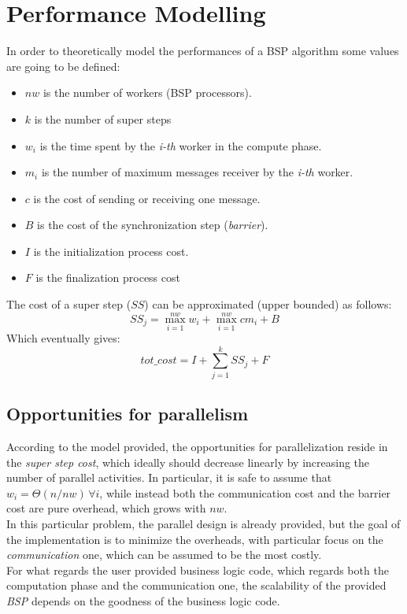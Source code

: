 \documentclass[]{article}
\begin{document}
\section{Performance Modelling}
\label{sec:perfModel}

In order to theoretically model the performances of a BSP algorithm some values are going to be defined:
\begin{itemize}
	\item $\mathit{nw}$ is the number of workers (BSP processors).
	\item $k$ is the number of super steps
	\item $w_i$ is the time spent by the \emph{i-th} worker in the compute phase.
	\item $m_i$ is the number of maximum messages receiver by the \emph{i-th} worker.
	\item $c$ is the cost of sending or receiving one message.
	\item $B$ is the cost of the synchronization step (\emph{barrier}).
	\item $I$ is the initialization process cost.
	\item $F$ is the finalization process cost
\end{itemize}
The cost of a super step ($\mathit{SS}$) can be approximated (upper bounded) as follows:
$$ \mathit{SS}_j = \max_{i=1}^{\mathit{nw}} w_i + \max_{i=1}^{\mathit{nw}} c m_i + B $$
Which eventually gives:
$$ \mathit{tot\_cost} = I + \sum_{j=1}^{k} \mathit{SS}_j + F $$
\subsection{Opportunities for parallelism}
According to the model provided, the opportunities for parallelization reside in the \emph{super step cost}, which ideally should decrease linearly by increasing the number of parallel activities. In particular, it is safe to assume that $w_i = \Theta(n/\mathit{nw}) \, \forall i$, while instead both the communication cost and the barrier cost are pure overhead, which grows with $\mathit{nw}$. \\
In this particular problem, the parallel design is already provided, but the goal of the implementation is to minimize the overheads, with particular focus on the \emph{communication} one, which can be assumed to be the most costly. \\

For what regards the user provided business logic code, which regards both the computation phase and the communication one, the scalability of the provided \emph{BSP} depends on the goodness of the business logic code.
\end{document}
